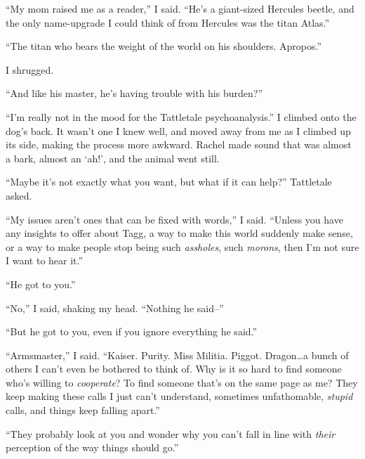 ``My mom raised me as a reader,'' I said.  ``He's a giant-sized Hercules beetle, and the only name-upgrade I could think of from Hercules was the titan Atlas.''



``The titan who bears the weight of the world on his shoulders.  Apropos.''



I shrugged.



``And like his master, he's having trouble with his burden?''



``I'm really not in the mood for the Tattletale psychoanalysis.''  I climbed onto the dog's back.  It wasn't one I knew well, and moved away from me as I climbed up its side, making the process more awkward.  Rachel made sound that was almost a bark, almost an `ah!', and the animal went still.



``Maybe it's not exactly what you want, but what if it can help?''  Tattletale asked.



``My issues aren't ones that can be fixed with words,'' I said.  ``Unless you have any insights to offer about Tagg, a way to make this world suddenly make sense, or a way to make people stop being such \emph{assholes}, such \emph{morons}, then I'm not sure I want to hear it.''



``He got to you.''



``No,'' I said, shaking my head.  ``Nothing he said--''



``But he got to you, even if you ignore everything he said.''



``Armsmaster,'' I said.  ``Kaiser.  Purity.  Miss Militia.  Piggot.  Dragon\ldots a bunch of others I can't even be bothered to think of.  Why is it so hard to find someone who's willing to \emph{cooperate}?  To find someone that's on the same page as me?  They keep making these calls I just can't understand, sometimes unfathomable, \emph{stupid} calls, and things keep falling apart.''



``They probably look at you and wonder why you can't fall in line with \emph{their} perception of the way things should go.''



